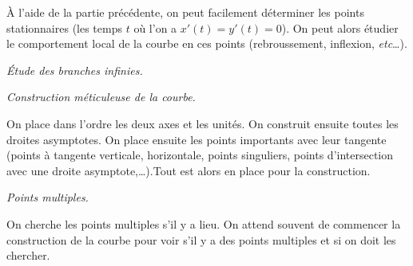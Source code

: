 \begin{description}
    À l'aide de la partie précédente, on peut facilement déterminer les points stationnaires (les temps $t$ où l'on a $x'(t)=y'(t)=0$). On peut alors étudier le comportement local de la courbe en ces points (rebroussement, inflexion, \textit{etc}\ldots). 

\item \emph{\'Etude des branches infinies.}

\item \emph{Construction méticuleuse de la courbe.}

On 
place dans l'ordre les deux axes et les unités. On construit 
ensuite toutes les droites asymptotes. On place ensuite les points 
importants avec leur tangente (points à tangente verticale, 
horizontale, points singuliers, points d'intersection 
avec une droite asymptote,\ldots).Tout est alors en place 
pour la construction.%






\item \emph{Points multiples.}

On cherche les points multiples s'il y a lieu. 
On attend souvent de commencer la construction de la courbe pour 
voir s'il y a des points multiples et si on doit les chercher.
\end{description}

